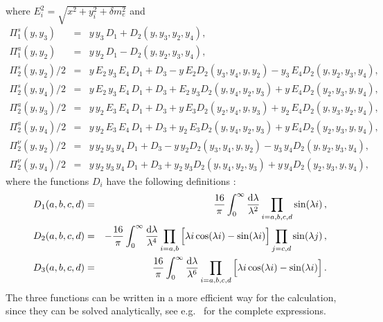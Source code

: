 \documentclass[notitlepage,showpacs,preprintnumbers,amsmath,amssymb,superscriptaddress,prd,onecolumn]{revtex4-1}
\begin{document}
where $E^2_i = \sqrt{x^2+y_i^2+\delta m_e^2}$ and
\begin{eqnarray}
\Pi_1^s(y,y_3)
&=&
y\,y_3\,D_1+D_2(y,y_3,y_2,y_4),
\\
\Pi_1^a(y,y_2)
&=&
y\,y_2\,D_1-D_2(y,y_2,y_3,y_4),
\\
\Pi_2^s(y,y_2)/2
&=&
y\,E_2\,y_3\,E_4\,D_1 + D_3 - y\,E_2 D_2(y_3,y_4,y,y_2) - y_3\,E_4 D_2(y,y_2,y_3,y_4),
\\
\Pi_2^s(y,y_4)/2
&=&
y\,E_2\,y_3\,E_4\,D_1 + D_3 + E_2\,y_3 D_2(y,y_4,y_2,y_3) + y\,E_4 D_2(y_2,y_3,y,y_4),
\\
\Pi_2^a(y,y_3)/2
&=&
y\,y_2\,E_3\,E_4\,D_1 + D_3 + y\,E_3 D_2(y_2,y_4,y,y_3) + y_2\,E_4 D_2(y,y_3,y_2,y_4),
\\
\Pi_2^a(y,y_4)/2
&=&
y\,y_2\,E_3\,E_4\,D_1 + D_3 + y_2\,E_3 D_2(y,y_4,y_2,y_3) + y\,E_4 D_2(y_2,y_3,y,y_4),
\\
\Pi_2^\nu(y,y_2)/2
&=&
y\,y_2\,y_3\,y_4\,D_1 + D_3 - y\,y_2 D_2(y_3,y_4,y,y_2) - y_3\,y_4 D_2(y,y_2,y_3,y_4),
\\
\Pi_2^\nu(y,y_4)/2
&=&
y\,y_2\,y_3\,y_4\,D_1 + D_3 + y_2\,y_3 D_2(y,y_4,y_2,y_3) + y\,y_4 D_2(y_2,y_3,y,y_4),
\end{eqnarray}
%
where the functions $D_i$ have the following definitions \cite{Dolgov:1997mb}:
%
\begin{eqnarray}
D_1(a,b,c,d)
&=&
\frac{16}{\pi}
\int_0^\infty
\frac{{\rm d}\lambda}{\lambda^2}
\prod_{i=a,b,c,d}\sin(\lambda i)
\,,\\
D_2(a,b,c,d)
&=&
-\frac{16}{\pi}
\int_0^\infty
\frac{{\rm d}\lambda}{\lambda^4}
\prod_{i=a,b}\Big[\lambda i \cos(\lambda i)-\sin(\lambda i)\Big]
\prod_{j=c,d}\sin(\lambda j)
\,,\\
D_3(a,b,c,d)
&=&
\frac{16}{\pi}
\int_0^\infty
\frac{\mathrm{d}\lambda}{\lambda^6}
\prod_{i=a,b,c,d}\Big[\lambda i \cos(\lambda i)-\sin(\lambda i)\Big]
\,.
\end{eqnarray}
The three functions can be written in a more efficient way for the calculation,
since they can be solved analytically, see e.g.~\cite{Blaschke:2016xxt} for the complete expressions.
\end{document}
